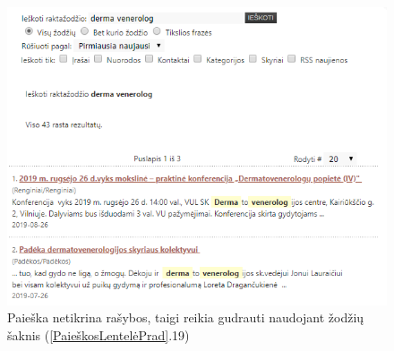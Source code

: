 \documentclass{VUMIFPSkursinis}
\begin{document}
\begin{figure}[H]
    \centering
    \includegraphics[scale=0.8]{img/ProtingaPaieška}
    \caption{Paieška netikrina rašybos, taigi reikia gudrauti naudojant žodžių šaknis (\ref{PaieškosLentelėPrad}.19)}
    \label{img:protingapaieška}
\end{figure}

\pagebreak
\end{document}
